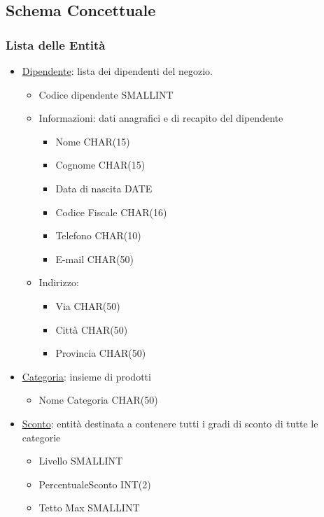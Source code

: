 \newpage
\subsection{Schema Concettuale}

\subsubsection{Lista delle Entit\`a}

\begin{itemize}

\item \underline{Dipendente}: lista dei dipendenti del negozio.
  
  \begin{itemize}

  \item Codice dipendente SMALLINT
    
  \item Informazioni: dati anagrafici e di recapito del dipendente
    \begin{itemize}
    \item Nome CHAR(15)
    \item Cognome CHAR(15)
    \item Data di nascita DATE
    \item Codice Fiscale CHAR(16)
    \item Telefono CHAR(10)
    \item E-mail CHAR(50)
    \end{itemize}
    
  \item Indirizzo:
    \begin{itemize}
    \item Via CHAR(50)
    \item Citt\`a CHAR(50)
    \item Provincia CHAR(50)
    \end{itemize}

  \end{itemize}

\item \underline{Categoria}: insieme di prodotti
  \begin{itemize}
  \item Nome Categoria CHAR(50)
  \end{itemize}

\item \underline{Sconto}: entit\`a destinata a contenere tutti i gradi di sconto di tutte le categorie
  \begin{itemize}
  \item Livello SMALLINT
  \item PercentualeSconto INT(2)
  \item Tetto Max SMALLINT
  \end{itemize}


\end{itemize}
